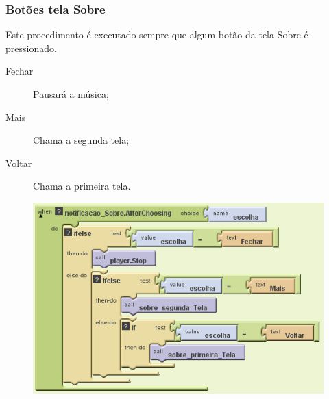 \documentclass[portugues, brazil, a4paper,12pt]{article}
\begin{document}
\subsubsection{Botões tela Sobre}
Este procedimento é executado sempre que algum botão da tela Sobre é pressionado.

\begin{description}
\item[Fechar] Pausará a música;
\item[Mais] Chama a segunda tela;
\item[Voltar] Chama a primeira tela.
\end{description}


\begin{figure}[H]
	\centering
	\includegraphics[scale=.8]{img/monitoramento/voltarSobre.png}
	
\end{figure}


\newpage
\end{document}
